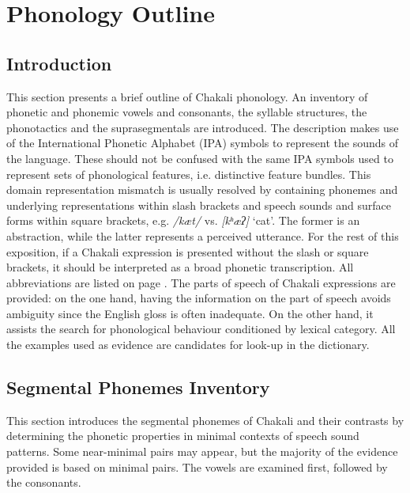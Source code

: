 
\chapter{Phonology Outline}
\label{sec:chap-phono}


\section{Introduction}
\label{sec:intro-phono}

This section presents a brief outline of Chakali phonology. An inventory of 
phonetic and phonemic vowels and consonants, the syllable structures, the 
phonotactics and the suprasegmentals are introduced.   The description makes 
use of the International Phonetic Alphabet (IPA)  symbols to represent the 
sounds of the language. These should not be confused with the same IPA symbols 
used to represent  sets of phonological features, i.e.  distinctive feature 
bundles. This domain representation mismatch is usually resolved by containing 
phonemes and underlying representations within slash brackets  and  speech 
sounds and surface forms within square brackets, e.g.  {\it /kæt/} vs.  {\it 
[kʰæʔ]} `cat'. The former is an abstraction, while the 
latter 
 represents a perceived utterance.  For the rest of this exposition, if a 
Chakali 
expression is presented without the slash or  square brackets, it should be 
interpreted as a broad phonetic transcription. All  abbreviations are listed 
on page \pageref{sec-ABB}.  The parts of speech of  Chakali 
expressions are provided: on the one hand,  having the  information on the part 
of 
speech avoids ambiguity since the English gloss is often inadequate. On the 
other hand,  it assists the search for phonological behaviour conditioned by 
lexical category.  All the examples used as evidence are candidates for look-up 
in the dictionary.


\section{Segmental Phonemes Inventory}
\label{sec:seg-phon-invent}

This section introduces the segmental phonemes of Chakali and their contrasts 
by determining the phonetic properties in minimal contexts of speech sound 
patterns.  Some near-minimal pairs may appear, but the   majority of the 
evidence provided is based on  minimal pairs. The vowels are examined first, 
followed by the consonants.


